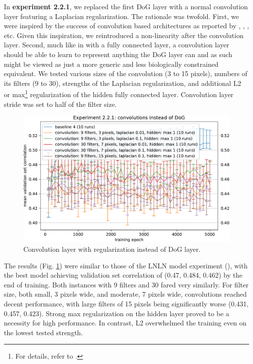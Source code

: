 In \textbf{experiment 2.2.1}, we replaced the first DoG layer with a normal convolution layer featuring a Laplacian regularization. The rationale was twofold. First, we were inspired by the success of convolution based architectures as reported by \cite{klindt}, \cite{ecker}, \cite{Walke506956}, etc. Given this inspiration, we reintroduced a non-linearity after the convolution layer. Second, much like in  with a fully connected layer, a convolution layer should be able to learn to represent anything the DoG layer can and as such might be viewed as just a more generic and less biologically constrained equivalent. We tested various sizes of the convolution (3 to 15 pixels), numbers of its filters (9 to 30), strengths of the Laplacian regularization, and additional L2 or max\footnote{For details, refer to .} regularization of the hidden fully connected layer. Convolution layer stride was set to half of the filter size.

\begin{figure}[H]
    \centering
    \includegraphics[width=1\textwidth]{../figures/05_2_2_1}
    \caption[Experiment 2.2.1]{Convolution layer with regularization instead of DoG layer.}
    \label{fig:5.2.2.1}
\end{figure}

The results (Fig. \ref{fig:5.2.2.1}) were similar to those of the {LNLN model} experiment (), with the best model achieving validation set correlation of (0.47, 0.484, 0.462) by the end of training. Both instances with 9 filters and 30 fared very similarly. For filter size, both small, 3 pixels wide, and moderate, 7 pixels wide, convolutions reached decent performance, with large filters of 15 pixels being significantly worse (0.431, 0.457, 0.423). Strong max regularization on the hidden layer proved to be a necessity for high performance. In contrast, L2 overwhelmed the training even on the lowest tested strength. 


